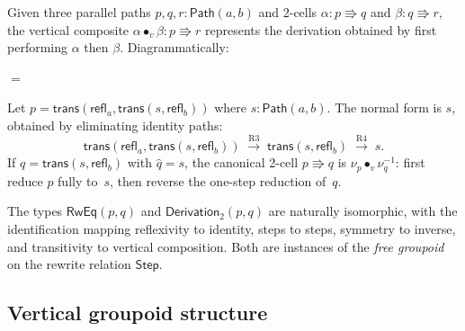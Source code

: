 \documentclass[manuscript]{BSLstyle}
\newcommand{\Path}{\mathsf{Path}}
\newcommand{\refl}{\mathsf{refl}}
\newcommand{\trans}{\mathsf{trans}}
\newcommand{\Step}{\mathsf{Step}}
\newcommand{\RwEq}{\mathsf{RwEq}}
\begin{document}
\begin{example}\label{ex:2cell-vcomp}
Given three parallel paths $p, q, r : \Path(a, b)$ and 2-cells
$\alpha : p \Rrightarrow q$ and $\beta : q \Rrightarrow r$, the
vertical composite $\alpha \bullet_v \beta : p \Rrightarrow r$
represents the derivation obtained by first performing $\alpha$ then $\beta$.
Diagrammatically:
\begin{center}
\qquad$=$\qquad
{}
\end{center}
\end{example}

\begin{example}\label{ex:canonical-2cell}
Let $p = \trans(\refl_a, \trans(s, \refl_b))$ where $s : \Path(a, b)$.
The normal form is $s$, obtained by eliminating identity paths:
\[
\trans(\refl_a, \trans(s, \refl_b))
\;\xrightarrow{\text{R3}}\;
\trans(s, \refl_b)
\;\xrightarrow{\text{R4}}\;
s.
\]
If $q = \trans(s, \refl_b)$ with $\hat{q} = s$, the canonical 2-cell
$p \Rrightarrow q$ is $\nu_p \bullet_v \nu_q^{-1}$: first reduce $p$
fully to~$s$, then reverse the one-step reduction of~$q$.
\end{example}

\begin{theorem}\label{thm:rweq-deriv2}
The types $\RwEq(p, q)$ and $\mathsf{Derivation}_2(p, q)$ are naturally
isomorphic, with the identification mapping reflexivity to identity,
steps to steps, symmetry to inverse, and transitivity to vertical
composition.  Both are instances of the \emph{free groupoid} on the
rewrite relation $\Step$.
\end{theorem}

\subsection{Vertical groupoid structure}
\end{document}
